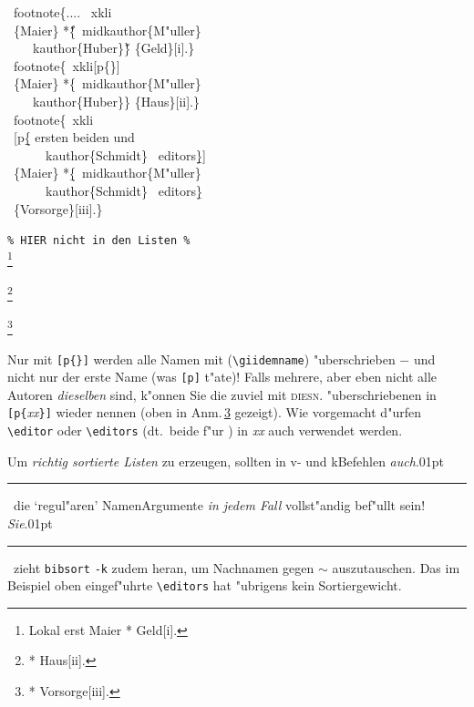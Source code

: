 \documentclass[12pt,a4paper]{article}
\newcommand{\pdfko}[1]{\kern #1pt
                              \rule[-0.4ex]{0.8pt}{0ex}\kern -0.8pt
                          \strut\ignorespaces}%
\newcommand{\pbs}{\string\ \unskip}
\newcommand{\bs}{\protect\pbs}
\begin{document}
\Doppelbox
{\vspace{1.25ex}%
 \bs footnote\{.... \bs xkli 
  \\ \ \{Maier\} *\H{\{}\bs midkauthor\{M"uller\} 
        \\ \ \ \ \bs kauthor\{Huber\}\H{\}} \{Geld\}[i].\}
 \\[1ex] \bs footnote\{\bs xkli[p\{\}] 
  \\ \ \{Maier\}  *\{\bs midkauthor\{M"uller\} 
        \\ \ \ \ \bs kauthor\{Huber\}\} \{Haus\}[ii].\}
 \\[1ex] \bs footnote\{\bs xkli 
 \\ \ [p\b{\b{\{}} ersten beiden und 
 \\ \ \ \ \ \ \bs kauthor\{Schmidt\} \bs editors\b{\b{\}}}]
 \\ \  \{Maier\} *\b{\{}\bs midkauthor\{M"uller\} 
 \\ \ \ \ \ \ \bs kauthor\{Schmidt\} \bs editors\b{\}} 
 \\ \ \{Vorsorge\}[iii].\}
 \vspace{1ex}
}
{\texttt{\% HIER nicht in den Listen \%}
 \\[3ex]
 \footnote{Lokal erst \xprintonlykli 
    {Maier} *{ } {Geld}[i].}
                
 \footnote{ *{ } {Haus}[ii].}
                
 \footnote{ *{  \editors} {Vorsorge}[iii].\label{wieder}}
}


\noindent\label{p}%
Nur mit \verb|[p{}]| werden alle Namen mit  (\verb|\giidemname|)
\hspace{.1em}"uberschrieben $-$ und nicht nur der erste Name (was \verb|[p]| t"ate)! \hspace{.15em}Falls mehrere, aber eben 
nicht alle Autoren \textit{dieselben} sind, k"onnen Sie die zuviel mit
\textsc{diesn.} "uberschriebenen in \verb|[p{|\textit{xx}\verb|}]| wieder nennen 
(oben in Anm.\,\ref{wieder} gezeigt). Wie vorgemacht d"urfen \verb|\editor| \hspace{.1em}oder 
\verb|\editors| (dt.\ beide f"ur {\small\editor}) \hspace{.1em}in \textit{xx} auch verwendet werden. 

Um \textit{richtig sortierte Listen} zu erzeugen, sollten in v- 
und k\fhy Befehlen \textit{auch}\pdfko{.01}\ die `regul"aren' Namen\hy Argumente
\textit{in jedem Fall} vollst"andig bef"ullt sein!
\textit{Sie}\pdfko{.01}\ zieht \hspace{.2em}\verb|bibsort| \verb|-k| \hspace{.2em}zudem heran, 
um Nachnamen gegen \hspace{.2em}$\sim$ \hspace{.2em}auszutauschen.
Das im Beispiel oben eingef"uhrte \verb|\editors| hat "ubrigens kein Sortiergewicht.
\end{document}
